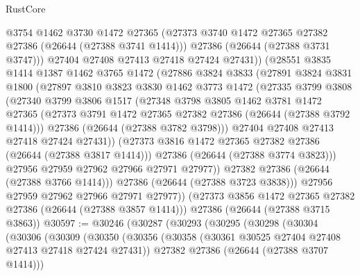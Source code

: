 \begin{lexlean}{RustCore}
\begin{coremodule}
                @3754
                @1462
                @3730
                @1472
                @27365
                (@27373 @3740 @1472 @27365 @27382 @27386 (@26644 (@27388 @3741 @1414)))
                @27386
                (@26644 (@27388 @3731 @3747)))
              @27404
              @27408
              @27413
              @27418
              @27424
              @27431))
          (@28551
            @3835
            @1414
            @1387
            @1462
            @3765
            @1472
            (@27886
              @3824
              @3833
              (@27891
                @3824
                @3831
                @1800
                (@27897
                  @3810
                  @3823
                  @3830
                  @1462
                  @3773
                  @1472
                  (@27335
                    @3799
                    @3808
                    (@27340
                      @3799
                      @3806
                      @1517
                      (@27348
                        @3798
                        @3805
                        @1462
                        @3781
                        @1472
                        @27365
                        (@27373 @3791 @1472 @27365 @27382 @27386 (@26644 (@27388 @3792 @1414)))
                        @27386
                        (@26644 (@27388 @3782 @3798)))
                      @27404
                      @27408
                      @27413
                      @27418
                      @27424
                      @27431))
                  (@27373 @3816 @1472 @27365 @27382 @27386 (@26644 (@27388 @3817 @1414)))
                  @27386
                  (@26644 (@27388 @3774 @3823)))
                @27956
                @27959
                @27962
                @27966
                @27971
                @27977))
            @27382
            @27386
            (@26644 (@27388 @3766 @1414)))
          @27386
          (@26644 (@27388 @3723 @3838)))
        @27956
        @27959
        @27962
        @27966
        @27971
        @27977))
    (@27373 @3856 @1472 @27365 @27382 @27386 (@26644 (@27388 @3857 @1414)))
    @27386
    (@26644 (@27388 @3715 @3863))
@30597 := @30246
    (@30287
      (@30293
        (@30295
          (@30298
            (@30304
              (@30306
                (@30309
                  (@30350
                    (@30356
                      (@30358 (@30361 @30525 @27404 @27408 @27413 @27418 @27424 @27431))
                      @27382
                      @27386
                      (@26644 (@27388 @3707 @1414)))

\end{coremodule}
\end{lexlean}
